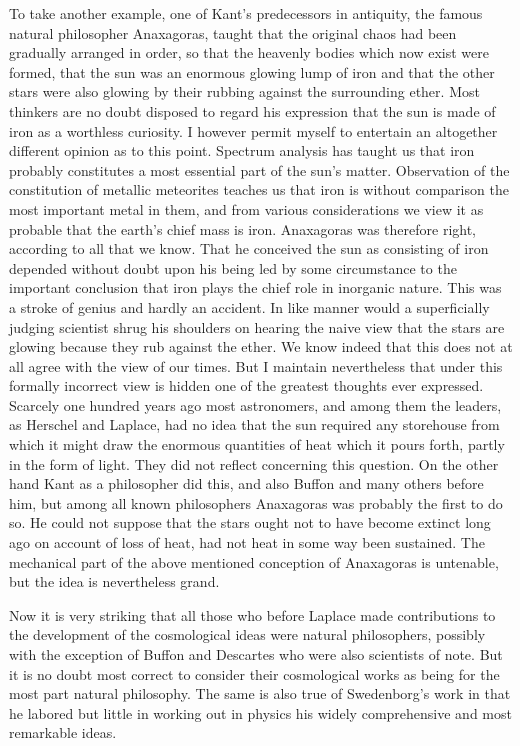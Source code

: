 \documentclass[a4paper, 11pt, oneside, polutonikogreek, english]{article}
\begin{document}
To take another example, one of Kant's predecessors in antiquity, the famous natural philosopher Anaxagoras, taught that the original chaos had been gradually arranged in order, so that the heavenly bodies which now exist were formed, that the sun was an enormous glowing lump of iron and that the other stars were also glowing by their rubbing against the surrounding ether. Most thinkers are no doubt disposed to regard his expression that the sun is made of iron as a worthless curiosity. I however permit myself to entertain an altogether different opinion as to this point. Spectrum analysis has taught us that iron probably constitutes a most essential part of the sun's matter. Observation of the constitution of metallic meteorites teaches us that iron is without comparison the most important metal in them, and from various considerations we view it as probable that the earth's chief mass is iron. Anaxagoras was therefore right, according to all that we know. That he conceived the sun as consisting of iron depended without doubt upon his being led by some circumstance to the important conclusion that iron plays the chief role in inorganic nature. This was a stroke of genius and hardly an accident. In like manner would a superficially judging scientist shrug his shoulders on hearing the naive view that the stars are glowing because they rub against the ether. We know indeed that this does not at all agree with the view of our times. But I maintain nevertheless that under this formally incorrect view is hidden one of the greatest thoughts ever expressed. Scarcely one hundred years ago most astronomers, and among them the leaders, as Herschel and Laplace, had no idea that the sun required any storehouse from which it might draw the enormous quantities of heat which it pours forth, partly in the form of light. They did not reflect concerning this question. On the other hand Kant as a philosopher did this, and also Buffon and many others before him, but among all known philosophers Anaxagoras was probably the first to do so. He could not suppose that the stars ought not to have become extinct long ago on account of loss of heat, had not heat in some way been sustained. The mechanical part of the above mentioned conception of Anaxagoras is untenable, but the idea is nevertheless grand.

Now it is very striking that all those who before Laplace made contributions to the development of the cosmological ideas were natural philosophers, possibly with the exception of Buffon and Descartes who were also scientists of note. But it is no doubt most correct to consider their cosmological works as being for the most part natural philosophy. The same is also true of Swedenborg's work in that he labored but little in working out in physics his widely comprehensive and most remarkable ideas.
\end{document}
